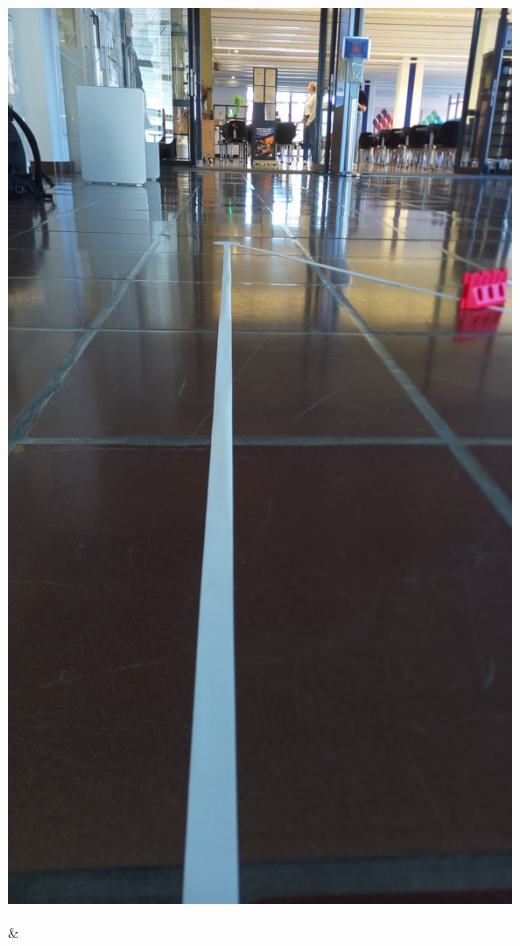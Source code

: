 \begin{table}[H]
\begin{tabularx}
\begin{minipage}{.18\textwidth}
\includegraphics[width=\linewidth]{assets/IT/testing/yolo/node-obst-on-the-side.jpg}
\end{minipage}
        &
\begin{minipage}{.18\textwidth}

\end{minipage}
\end{tabularx}
\end{table}
